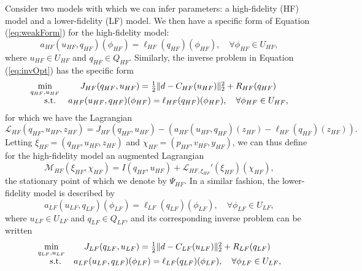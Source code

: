 Consider two models with which we can infer parameters: a high-fidelity (HF) model and a lower-fidelity (LF) model. We then have a specific form of Equation (\ref{eq:weakForm}) for the high-fidelity model:
\begin{equation}
a_{HF}(u_{HF},q_{HF})(\phi_{HF})=\ell_{HF}(q_{HF})(\phi_{HF}),\quad\forall\phi_{HF}\in U_{HF},
\end{equation}
where $u_{HF}\in U_{HF}$ and $q_{HF}\in Q_{HF}$. Similarly, the inverse problem in Equation (\ref{eq:invOpt}) has the specific form
\begin{equation}
\begin{array}{r@{}c}
\min\limits_{q_{HF},u_{HF}} & \quad J_{HF}(q_{HF},u_{HF})=\frac{1}{2}\|d-C_{HF}(u_{HF})\|_2^2 + R_{HF}(q_{HF}) \\ \textrm{s.t. }& \quad a_{HF}(u_{HF},q_{HF})(\phi_{HF})=\ell_{HF}(q_{HF})(\phi_{HF}),\quad\forall\phi_{HF}\in U_{HF},
\end{array}
\end{equation}
for which we have the Lagrangian
\begin{equation}
\mathcal{L}_{HF}(q_{HF},u_{HF},z_{HF})= J_{HF}(q_{HF},u_{HF})-(a_{HF}(u_{HF},q_{HF})(z_{HF})-\ell_{HF}(q_{HF})(z_{HF})).
\end{equation}
Letting $\xi_{HF}=(q_{HF},u_{HF},z_{HF})$ and $\chi_{HF}=(p_{HF},v_{HF},y_{HF})$, we can thus define for the high-fidelity model an augmented Lagrangian
\begin{equation}
\mathcal{M}_{HF}(\xi_{HF},\chi_{HF}) = I(q_{HF},u_{HF}) + \mathcal{L}_{HF,\xi_{HF}}'(\xi_{HF})(\chi_{HF}),
\label{eq:MHF}
\end{equation}
the stationary point of which we denote by $\Psi_{HF}$. In a similar fashion, the lower-fidelity model is described by
\begin{equation}
a_{LF}(u_{LF},q_{LF})(\phi_{LF})=\ell_{LF}(q_{LF})(\phi_{LF}),\quad\forall\phi_{LF}\in U_{LF},
\end{equation}
where $u_{LF}\in U_{LF}$ and $q_{LF}\in Q_{LF}$, and its corresponding inverse problem can be written
\begin{equation}
\begin{array}{r@{}c}
\min\limits_{q_{LF},u_{LF}} & \quad J_{LF}(q_{LF},u_{LF})=\frac{1}{2}\|d-C_{LF}(u_{LF})\|_2^2 + R_{LF}(q_{LF}) \\ \textrm{s.t. }& \quad a_{LF}(u_{LF},q_{LF})(\phi_{LF})=\ell_{LF}(q_{LF})(\phi_{LF}),\quad\forall\phi_{LF}\in U_{LF},
\end{array}
\end{equation}
